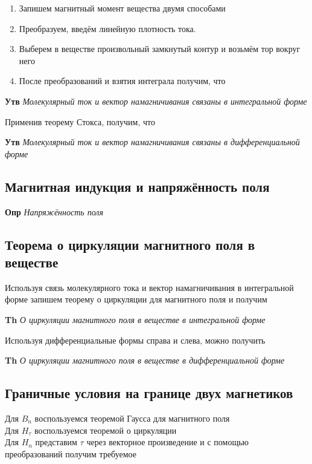 \documentclass[a4paper, 14pt]{article}
\begin{document}
    \begin{enumerate}
        \item Запишем магнитный момент вещества двумя способами
        \item Преобразуем, введём линейную плотность тока.
        \item Выберем в веществе произвольный замкнутый контур и возьмём тор вокруг него
        \item После преобразований и взятия интеграла получим, что
    \end{enumerate}
    
    \textbf{Утв} \textit{Молекулярный ток и вектор намагничивания связаны в интегральной форме}
    
    Применив теорему Стокса, получим, что
    
    \textbf{Утв} \textit{Молекулярный ток и вектор намагничивания связаны в дифференциальной форме}
    
    \subsection{Магнитная индукция и напряжённость поля}
    
    \textbf{Опр} \textit{Напряжённость поля}
    
    \subsection{Теорема о циркуляции магнитного поля в веществе}
    
    Используя связь молекулярного тока и вектор намагничивания в интегральной форме запишем теорему о циркуляции для
    магнитного поля и получим
    
    \textbf{Th} \textit{О циркуляции магнитного поля в веществе в интегральной форме}
    
    Используя дифференциальные формы справа и слева, можно получить
    
    \textbf{Th} \textit{О циркуляции магнитного поля в веществе в дифференциальной форме}
    
    \subsection{Граничные условия на границе двух магнетиков}
    
    Для $B_n$ воспользуемся теоремой Гаусса для магнитного поля \\
    Для $H_\tau$ воспользуемся теоремой о циркуляции \\
    Для $H_n$ представим $\tau$ через векторное произведение и с помощью преобразований получим требуемое
    
\end{document}
